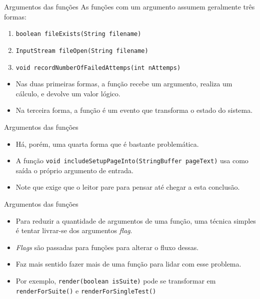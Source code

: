 \documentclass[11pt]{beamer}
\begin{document}
  \begin{frame}[fragile]{Argumentos das funções}
    As funções com um argumento assumem geralmente três formas:
    
    \begin{enumerate}
      \item \verb|boolean fileExists(String filename)|
      \item \verb|InputStream fileOpen(String filename)|
      \item \verb|void recordNumberOfFailedAttemps(int nAttemps)|
    \end{enumerate}

    \begin{itemize}
      \item Nas duas primeiras formas, a função recebe um argumento, realiza um cálculo, e devolve um valor lógico.
      \item Na terceira forma, a função é um evento que transforma o estado do sistema.
    \end{itemize}
  \end{frame}

  \begin{frame}[fragile]{Argumentos das funções}
    \begin{itemize}
      \item Há, porém, uma quarta forma que é bastante problemática.
      \item A função \verb|void includeSetupPageInto(StringBuffer pageText)| usa como saída o próprio argumento de entrada.
      \item Note que exige que o leitor pare para pensar até chegar a esta conclusão.
    \end{itemize}
  \end{frame}

  \begin{frame}[fragile]{Argumentos das funções}
    \begin{itemize}
      \item Para reduzir a quantidade de argumentos de uma função, uma técnica simples é tentar livrar-se dos argumentos \textit{flag}.
      \item \textit{Flags} são passadas para funções para alterar o fluxo dessas.
      \item Faz mais sentido fazer mais de uma função para lidar com esse problema.
      \item Por exemplo, \verb|render(boolean isSuite)| pode se transformar em \verb|renderForSuite()| e \verb|renderForSingleTest()|
    \end{itemize}
  \end{frame}
\end{document}

